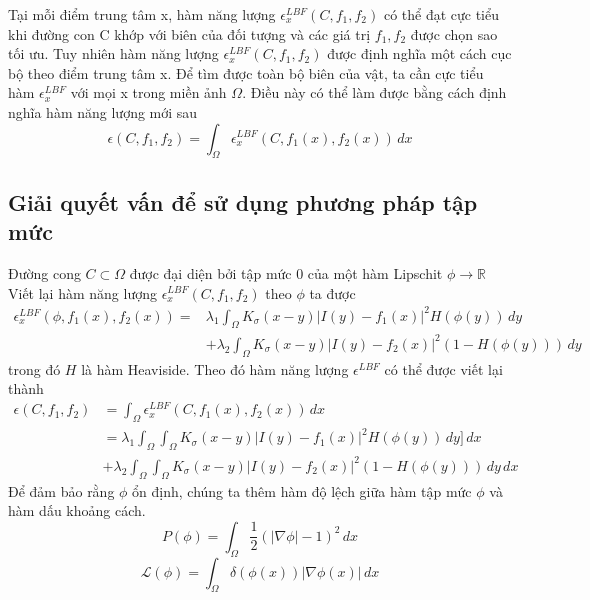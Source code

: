 \documentclass[12pt,oneside,a4]{report}
\begin{document}
Tại mỗi điểm trung tâm x, hàm năng lượng $\epsilon_x^{LBF}(C,f_1, f_2)$   có thể đạt cực tiểu khi đường con C khớp với biên của đối tượng và các giá trị $f_1, f_2$ được chọn sao tối ưu. Tuy nhiên hàm năng lượng $\epsilon_x^{LBF}(C,f_1, f_2)$ được định nghĩa một cách cục bộ theo điểm trung tâm x. Để tìm được toàn bộ biên của vật, ta cần cực tiểu hàm $\epsilon_x^{LBF}$  với mọi x trong miền ảnh $\Omega$. Điều này có thể làm được bằng cách định nghĩa hàm năng lượng mới sau
\begin{equation}
\epsilon(C, f_1, f_2)=\int_{\Omega} \epsilon_x^{LBF}(C, f_1(x), f_2(x))\,dx
\end{equation}
\subsection{Giải quyết vấn để sử dụng phương pháp tập mức}
Đường cong $C \subset \Omega$ được đại diện bởi tập mức 0 của một hàm Lipschit $\phi \rightarrow \mathbb{R}$
Viết lại hàm năng lượng $\epsilon_x^{LBF}(C,f_1, f_2)$ theo $\phi$ ta được
\begin{equation}
\begin{split}
\epsilon_x^{LBF}(\phi, f_1(x), f_2(x))
=&\lambda_1 \int_{\Omega} K_{\sigma}(x-y)|I(y)-f_1(x)|^2H(\phi(y))\,dy\\ &+ \lambda_2 \int_{\Omega} K_{\sigma}(x-y)|I(y)-f_2(x)|^2(1-H(\phi(y)))\,dy 
\end{split}
\end{equation}
trong đó $H$ là hàm Heaviside. Theo đó hàm năng lượng $\epsilon^{LBF}$ có thể được viết lại thành
\begin{equation}
\begin{split}
\epsilon(C, f_1, f_2)&=\int_{\Omega} \epsilon_x^{LBF}(C, f_1(x), f_2(x))\,dx\\
&=\lambda_1 \int_{\Omega}\int_{\Omega} K_{\sigma}(x-y)|I(y)-f_1(x)|^2H(\phi(y))\,dy]\,dx \\
&+ \lambda_2 \int_{\Omega}\int_{\Omega} K_{\sigma}(x-y)|I(y)-f_2(x)|^2(1-H(\phi(y)))\,dy \,dx
\end{split}
\end{equation}
Để đảm bảo rằng $\phi$ ổn định, chúng ta thêm hàm độ lệch giữa hàm tập mức $\phi$ và hàm dấu khoảng cách.
\begin{equation}
P(\phi)= \int_{\Omega}\dfrac{1}{2}(|\nabla \phi|-1)^2\,dx
\end{equation}
\begin{equation}
\mathcal{L}(\phi)=\int_{\Omega}\delta(\phi(x))|\nabla \phi(x)|\,dx
\end{equation}
\end{document}
